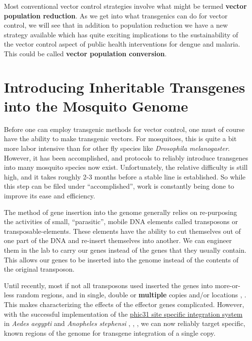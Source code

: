 Most conventional vector control strategies involve what might be termed \textbf{vector population reduction}.
As we get into what transgenics can do for vector control, we will see that in addition to population reduction we have a new strategy available which has quite exciting implications to the sustainability of the vector control aspect of public health interventions for dengue and malaria.
This could be called \textbf{vector population conversion}.

\section{Introducing Inheritable Transgenes into the Mosquito Genome}

Before one can employ transgenic methods for vector control, one must of course have the ability to make transgenic vectors.
For mosquitoes, this is quite a bit more labor intensive than for other fly species like \emph{Drosophila melanogaster}.
However, it has been accomplished, and protocols to reliably introduce transgenes into many mosquito species now exist.
Unfortunately, the relative difficulty is still high, and it takes roughly 2-3 months before a stable line is established.
So while this step can be filed under ``accomplished'', work is constantly being done to improve its ease and efficiency.

The method of gene insertion into the genome generally relies on re-purposing the activities of small, ``parasitic'', mobile DNA elements called \glspl{transposon} or \glspl{transposable-element}.
These elements have the ability to cut themselves out of one part of the DNA and re-insert themselves into another.
We can engineer them in the lab to carry our genes instead of the genes that they usually contain.
This allows our genes to be inserted into the genome instead of the contents of the original transposon.

Until recently, most if not all transposons used inserted the genes into more-or-less random regions, and in single, double or \textbf{multiple} copies and/or locations \cite{Adelman2004}, \cite{Sethuraman2007}.
This makes characterizing the effects of the effector genes complicated.
However, with the successful implementation of the \href{http://en.wikipedia.org/wiki/Site-specific\_recombinase\_technology\#PhiC31\_Integrase}{phic31 site specific integration system} in \emph{Aedes aegypti} and \emph{Anopheles stephensi} \cite{Thorpe1998}, \cite{Nimmo2006}, \cite{Isaacs2012}, we can now reliably target specific, known regions of the genome for transgene integration of a single copy.

